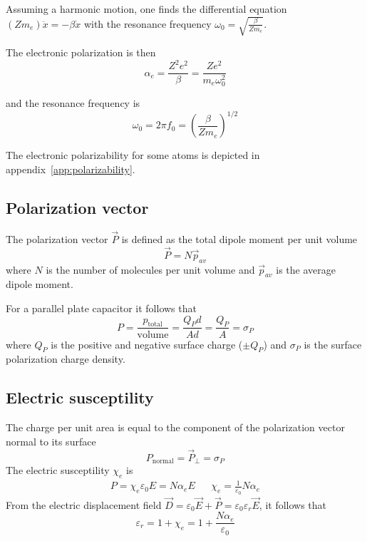 Assuming a harmonic motion, one finds the differential equation $(Z m_e) \ddot{x} = -\beta\dot{x}$ with the resonance frequency $\omega_0 = \sqrt{\frac{\beta}{Z m_e}}$.

The electronic polarization is then
\begin{equation}
	\alpha_e = \frac{Z^2 e^2}{\beta} = \frac{Z e^2 }{m_e \omega_0^2}
\end{equation}

and the resonance frequency is
\begin{equation}
	\omega_0 = 2 \pi f_0 = \left( \frac{\beta}{Zm_e} \right)^{1/2}
\end{equation}

The electronic polarizability for some atoms is depicted in appendix~\ref{app:polarizability}.

\subsection{Polarization vector}
The polarization vector $\vec{P}$ is defined as the total dipole moment per unit volume
\begin{equation}
	\vec{P} = N \vec{p}_{av}
\end{equation}
where $N$ is the number of molecules per unit volume and $\vec{p}_{av}$ is the average dipole moment.

For a parallel plate capacitor it follows that
\begin{equation}
	P = \frac{p_{\text{total}}}{\text{volume}} = \frac{Q_P d}{A d} = \frac{Q_P}{A} = \sigma_P
\end{equation}
where $Q_P$ is the positive and negative surface charge ($\pm Q_P$) and $\sigma_P$ is the surface polarization charge density.

\subsection{Electric susceptility}
The charge per unit area is equal to the component of the polarization vector
normal to its surface
\begin{equation}
    P_{\text{normal}} = \vec{P}_{\bot} = \sigma_P
\end{equation}
The electric susceptility $\chi_e$ is
\begin{align}
	P = \chi_e \varepsilon_0 E = N \alpha_e E && \chi _e = \frac{1}{\varepsilon_0} N \alpha_e
\end{align}
From the electric displacement field $\vec{D}=\varepsilon_0 \vec{E} + \vec{P} = \varepsilon_0\varepsilon_r \vec{E}$, it follows that
\begin{equation}
	\varepsilon_r  = 1 + \chi_e = 1 + \frac{N \alpha_e}{\varepsilon_0}
\end{equation}

